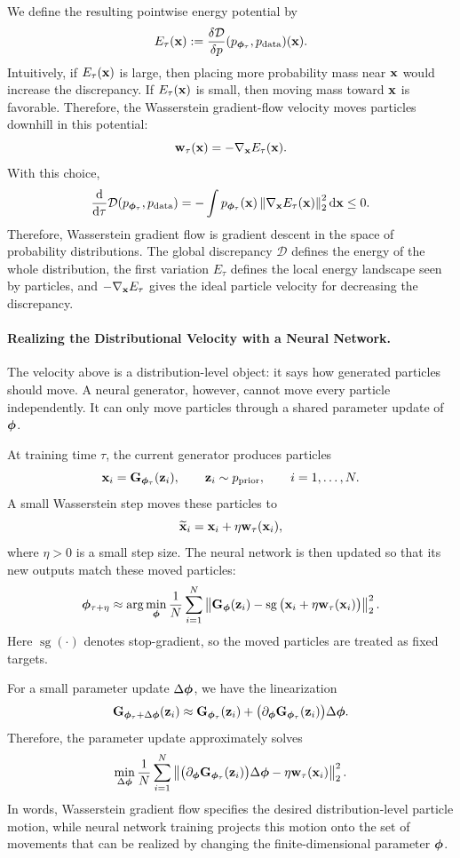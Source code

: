 We define the resulting pointwise energy potential by
\[
    E_\tau({\mathbf{x}})
    :=
    \frac{\delta\mathcal{D}}{\delta p}
    (p_{{\bm{\phi}}_\tau},p_{\mathrm{data}})({\mathbf{x}}).
\]
Intuitively, if $E_\tau({\mathbf{x}})$ is large, then placing more probability mass
near ${\mathbf{x}}$ would increase the discrepancy.  If $E_\tau({\mathbf{x}})$ is small,
then moving mass toward ${\mathbf{x}}$ is favorable.  Therefore, the Wasserstein
gradient-flow velocity moves particles downhill in this potential:
\[
    {\mathbf{w}}_\tau({\mathbf{x}})
    =
    -
    \nabla_{{\mathbf{x}}}E_\tau({\mathbf{x}}).
\]
With this choice,
\[
    \frac{\mathop{}\!\mathrm{d}}{\mathop{}\!\mathrm{d} \tau}
    \mathcal{D}(p_{{\bm{\phi}}_\tau},p_{\mathrm{data}})
    =
    -
    \int
    p_{{\bm{\phi}}_\tau}({\mathbf{x}})
    \left\|
        \nabla_{{\mathbf{x}}}E_\tau({\mathbf{x}})
    \right\|_2^2
    \mathop{}\!\mathrm{d}{\mathbf{x}}
    \le 0.
\]
Therefore, Wasserstein gradient flow is gradient descent in the space of
probability distributions.  The global discrepancy $\mathcal{D}$ defines the
energy of the whole distribution, the first variation $E_\tau$ defines the
local energy landscape seen by particles, and
$-\nabla_{{\mathbf{x}}}E_\tau$ gives the ideal particle velocity for decreasing the
discrepancy.

\paragraph{Realizing the Distributional Velocity with a Neural Network.}
The velocity above is a distribution-level object: it says how generated
particles should move.  A neural generator, however, cannot move every particle
independently.  It can only move particles through a shared parameter update of
${\bm{\phi}}$.

At training time $\tau$, the current generator produces particles
\[
    {\mathbf{x}}_i
    =
    {\mathbf{G}}_{{\bm{\phi}}_\tau}({\mathbf{z}}_i),
    \qquad
    {\mathbf{z}}_i\sim p_{\mathrm{prior}},
    \qquad
    i=1,\ldots,N.
\]
A small Wasserstein step moves these particles to
\[
    \widetilde{{\mathbf{x}}}_i
    =
    {\mathbf{x}}_i+\eta{\mathbf{w}}_\tau({\mathbf{x}}_i),
\]
where $\eta>0$ is a small step size.  The neural network is then updated so
that its new outputs match these moved particles:
\[
    {\bm{\phi}}_{\tau+\eta}
    \approx
    \arg\min_{{\bm{\phi}}}
    \frac{1}{N}
    \sum_{i=1}^N
    \left\|
        {\mathbf{G}}_{{\bm{\phi}}}({\mathbf{z}}_i)
        -
        \operatorname{sg}
        \big(
            {\mathbf{x}}_i+\eta{\mathbf{w}}_\tau({\mathbf{x}}_i)
        \big)
    \right\|_2^2.
\]
Here $\operatorname{sg}(\cdot)$ denotes stop-gradient, so the moved particles
are treated as fixed targets.

For a small parameter update $\Delta{\bm{\phi}}$, we have the linearization
\[
    {\mathbf{G}}_{{\bm{\phi}}_\tau+\Delta{\bm{\phi}}}({\mathbf{z}}_i)
    \approx
    {\mathbf{G}}_{{\bm{\phi}}_\tau}({\mathbf{z}}_i)
    +
    \big(\partial_{{\bm{\phi}}}{\mathbf{G}}_{{\bm{\phi}}_\tau}({\mathbf{z}}_i)\big)\Delta{\bm{\phi}}.
\]
Therefore, the parameter update approximately solves
\[
    \min_{\Delta{\bm{\phi}}}
    \frac{1}{N}
    \sum_{i=1}^N
    \left\|
        \big(\partial_{{\bm{\phi}}}{\mathbf{G}}_{{\bm{\phi}}_\tau}({\mathbf{z}}_i)\big)\Delta{\bm{\phi}}
        -
        \eta{\mathbf{w}}_\tau({\mathbf{x}}_i)
    \right\|_2^2.
\]
In words, Wasserstein gradient flow specifies the desired distribution-level
particle motion, while neural network training projects this motion onto the
set of movements that can be realized by changing the finite-dimensional
parameter ${\bm{\phi}}$.

